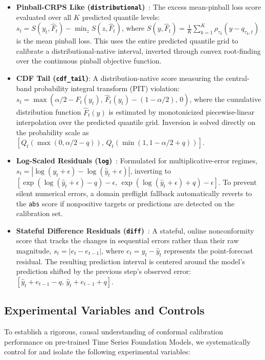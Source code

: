 \documentclass[12pt, a4paper]{article}
\begin{document}
\begin{itemize}
	\item \textbf{Pinball-CRPS Like (\texttt{distributional})}~\cite{gneiting-raftery, zamo-naveau}: The excess mean-pinball loss score evaluated over all \(K\) predicted quantile levels: \(s_t = S(y_t, \hat{F}_t) - \min_z S(z, \hat{F}_t)\), where \(S(y, \hat{F}_t) = \frac{1}{K}\sum_{k=1}^K \rho_{\tau_k}(y - q_{\tau_k, t})\) is the mean pinball loss. This uses the entire predicted quantile grid to calibrate a distributional-native interval, inverted through convex root-finding over the continuous pinball objective function.
	\item \textbf{CDF Tail (\texttt{cdf\_tail})}: A distribution-native score measuring the central-band probability integral transform (PIT) violation: \(s_t = \max(\alpha/2 - \hat{F}_t(y_t), \, \hat{F}_t(y_t) - (1 - \alpha/2), \, 0)\), where the cumulative distribution function \(\hat{F}_t(y)\) is estimated by monotonicized piecewise-linear interpolation over the predicted quantile grid. Inversion is solved directly on the probability scale as \([Q_t(\max(0, \alpha/2 - q)), \, Q_t(\min(1, 1 - \alpha/2 + q))]\).
	\item \textbf{Log-Scaled Residuals (\texttt{log})}~\cite{hyndman-fpp}: Formulated for multiplicative-error regimes, \(s_t = |\log(y_t + \epsilon) - \log(\hat{y}_t + \epsilon)|\), inverting to \([\exp(\log(\hat{y}_t + \epsilon) - q) - \epsilon, \, \exp(\log(\hat{y}_t + \epsilon) + q) - \epsilon]\). To prevent silent numerical errors, a domain preflight fallback automatically reverts to the \texttt{abs} score if nonpositive targets or predictions are detected on the calibration set.
	\item \textbf{Stateful Difference Residuals (\texttt{diff})}~\cite{chernozhukov-cqr}: A stateful, online nonconformity score that tracks the changes in sequential errors rather than their raw magnitude, \(s_t = |e_t - e_{t-1}|\), where \(e_t = y_t - \hat{y}_t\) represents the point-forecast residual. The resulting prediction interval is centered around the model's prediction shifted by the previous step's observed error: \([\hat{y}_t + e_{t-1} - q, \, \hat{y}_t + e_{t-1} + q]\).
\end{itemize}

\subsection{Experimental Variables and Controls} \label{subsec:controls}
To establish a rigorous, causal understanding of conformal calibration performance on pre-trained Time Series Foundation Models, we systematically control for and isolate the following experimental variables:
\end{document}

